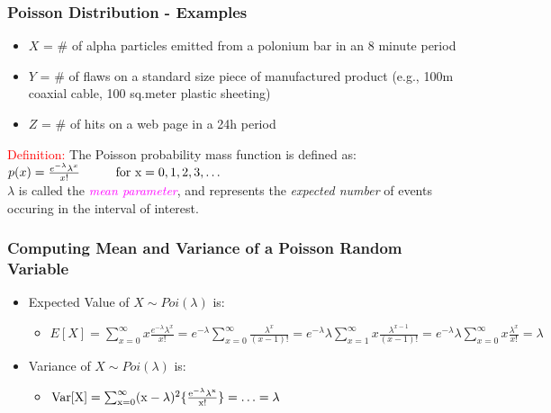 \documentclass[xcolor=dvipsnames,12pt]{beamer}
\begin{document}
\begin{frame}
\frametitle{Poisson Distribution - Examples}
\begin{itemize}
\item $X$ = \# of alpha particles emitted from a polonium bar in an 8 minute period \\[.01in]
\item  $Y$ = \# of flaws on a standard size piece of manufactured product 
(e.g., 100m coaxial cable, 100 sq.meter plastic sheeting)\\[.01in]
\item $Z$ = \# of hits on a web page in a 24h period 
\end{itemize}
{\textcolor{red}{Definition:}}  The Poisson probability mass function is defined as:\\[.1in]
\hspace*{2.5in} $p(x) = \frac{e^{-\lambda}\lambda^{x}}{x!} \hspace{1cm} \rm{ for }\ x = 0,1,2,3,\ldots$\\[.1in]
$\lambda$ is called the {\textcolor{magenta}{{\it mean parameter}}}, and represents the \emph{expected number} of events occuring in the  interval of interest.\\[.01in]   
\end{frame}




\begin{frame}
\frametitle{Computing Mean and Variance of a Poisson Random Variable}
\begin{itemize}
\item  Expected Value of $X \sim Poi({\lambda})$ is:
\begin{itemize}
\item $E[X]= \sum_{x=0}^{\infty} x\frac{e^{-\lambda}\lambda^{x}}{x!} = e^{-\lambda}\sum\limits_{x=0}^\infty\frac{\lambda^x}{(x-1)!}=e^{-\lambda}\lambda\sum\limits_{x=1}^\infty x\frac{\lambda^{x-1}}{(x-1)!}= e^{-\lambda}\lambda\sum\limits_{x=0}^\infty x\frac{\lambda^x}{x!}=\lambda $
\end{itemize}
\item Variance of $X \sim Poi({\lambda})$ is:
\begin{itemize}
\item  $\rm{Var}[X] =\sum_{x=0}^{\infty} (x-\lambda)^2 \{\frac{e^{-\lambda}\lambda^{x}}{x!}\} =\ldots = \lambda$ 
\hspace*{1in} 
\end{itemize}
\end{itemize}
\end{frame}
\end{document}
